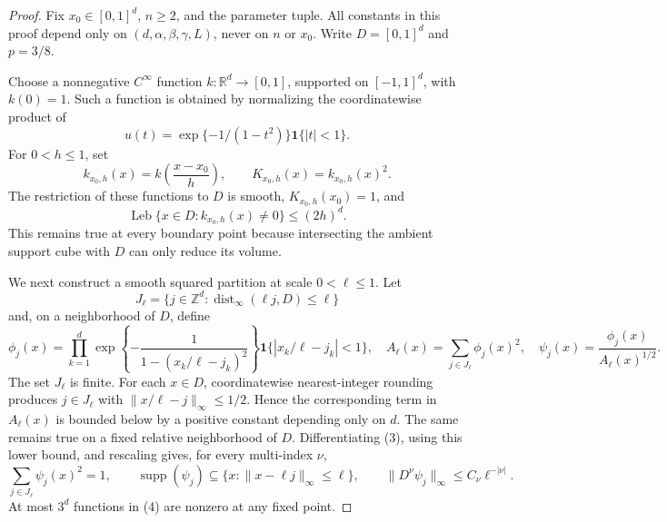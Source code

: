 \documentclass{article}
\begin{document}
\begin{proof}
Fix \(x_0\in[0,1]^d\), \(n\ge2\), and the parameter tuple.  All constants in this proof depend only on \((d,\alpha,\beta,\gamma,L)\), never on \(n\) or \(x_0\).  Write \(D=[0,1]^d\) and \(p=3/8\).

Choose a nonnegative \(C^\infty\) function \(k:\mathbb R^d\to[0,1]\), supported on \([-1,1]^d\), with \(k(0)=1\).  Such a function is obtained by normalizing the coordinatewise product of
\[
 u(t)=\exp\{-1/(1-t^2)\}\mathbf 1\{|t|<1\}.
\]
For \(0<h\le1\), set
\[
 k_{x_0,h}(x)=k\!\left(\frac{x-x_0}{h}\right),
 \qquad K_{x_0,h}(x)=k_{x_0,h}(x)^2.                                      \tag{1}
\]
The restriction of these functions to \(D\) is smooth, \(K_{x_0,h}(x_0)=1\), and
\[
 \operatorname{Leb}\{x\in D:k_{x_0,h}(x)\ne0\}\le(2h)^d.                \tag{2}
\]
This remains true at every boundary point because intersecting the ambient support cube with \(D\) can only reduce its volume.

We next construct a smooth squared partition at scale \(0<\ell\le1\).  Let
\[
 J_\ell=\{j\in\mathbb Z^d:\operatorname{dist}_\infty(\ell j,D)\le\ell\}
\]
and, on a neighborhood of \(D\), define
\[
 \phi_j(x)=\prod_{k=1}^d
 \exp\!\left\{-\frac{1}{1-(x_k/\ell-j_k)^2}\right\}
 \mathbf 1\{|x_k/\ell-j_k|<1\},
 \quad
 A_\ell(x)=\sum_{j\in J_\ell}\phi_j(x)^2,
 \quad
 \psi_j(x)=\frac{\phi_j(x)}{A_\ell(x)^{1/2}}.                    \tag{3}
\]
The set \(J_\ell\) is finite.  For each \(x\in D\), coordinatewise nearest-integer rounding produces \(j\in J_\ell\) with \(\lVert x/\ell-j\rVert_\infty\le1/2\).  Hence the corresponding term in \(A_\ell(x)\) is bounded below by a positive constant depending only on \(d\).  The same remains true on a fixed relative neighborhood of \(D\).  Differentiating (3), using this lower bound, and rescaling gives, for every multi-index \(\nu\),
\[
 \sum_{j\in J_\ell}\psi_j(x)^2=1,
 \qquad
 \operatorname{supp}(\psi_j)\subseteq
 \{x:\lVert x-\ell j\rVert_\infty\le\ell\},
 \qquad
 \lVert D^\nu\psi_j\rVert_\infty\le C_\nu\ell^{-|\nu|}.       \tag{4}
\]
At most \(3^d\) functions in (4) are nonzero at any fixed point.


\end{proof}
\end{document}
